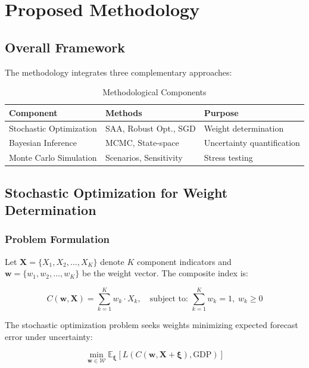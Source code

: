 \documentclass[12pt,a4paper]{article}
\newcommand{\E}{\mathbb{E}}
\begin{document}
\section{Proposed Methodology}

\subsection{Overall Framework}

The methodology integrates three complementary approaches:

\begin{table}[htbp]
\centering
\caption{Methodological Components}
\label{tab:methodology}
\begin{tabular}{@{}lll@{}}
\toprule
\textbf{Component} & \textbf{Methods} & \textbf{Purpose} \\
\midrule
Stochastic Optimization & SAA, Robust Opt., SGD & Weight determination \\
Bayesian Inference & MCMC, State-space & Uncertainty quantification \\
Monte Carlo Simulation & Scenarios, Sensitivity & Stress testing \\
\bottomrule
\end{tabular}
\end{table}

\subsection{Stochastic Optimization for Weight Determination}

\subsubsection{Problem Formulation}

Let $\mathbf{X} = \{X_1, X_2, \ldots, X_K\}$ denote $K$ component indicators and $\mathbf{w} = \{w_1, w_2, \ldots, w_K\}$ be the weight vector. The composite index is:

\begin{equation}
    C(\mathbf{w}, \mathbf{X}) = \sum_{k=1}^{K} w_k \cdot X_k, \quad \text{subject to: } \sum_{k=1}^{K} w_k = 1, \; w_k \geq 0
\end{equation}

The stochastic optimization problem seeks weights minimizing expected forecast error under uncertainty:

\begin{equation}
    \min_{\mathbf{w} \in \mathcal{W}} \E_{\boldsymbol{\xi}}\left[ L\left(C(\mathbf{w}, \mathbf{X} + \boldsymbol{\xi}), \text{GDP}\right) \right]
    \label{eq:stochastic_problem}
\end{equation}
\end{document}
